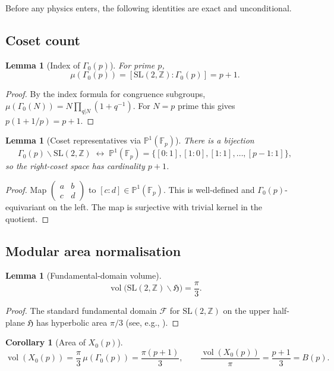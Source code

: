 \documentclass[12pt,a4paper]{article}
\newtheorem{lemma}[theorem]{Lemma}
\newtheorem{corollary}[theorem]{Corollary}
\theoremstyle{definition}
\theoremstyle{remark}
\newcommand{\SL}{\mathrm{SL}}
\newcommand{\vol}{\operatorname{vol}}
\newcommand{\bH}{\mathfrak{H}}     %
\newcommand{\ZZ}{\mathbb{Z}}
\newcommand{\FF}{\mathbb{F}}
\newcommand{\PP}{\mathbb{P}}
\newcommand{\Gam}{\Gamma}
\begin{document}
Before any physics enters, the following identities are exact and
unconditional.

\subsection{Coset count}

\begin{lemma}[Index of $\Gam_0(p)$]
\label{lem:index}
For prime $p$,
\[
  \mu(\Gam_0(p)) = [\SL(2,\ZZ):\Gam_0(p)] = p+1.
\]
\end{lemma}

\begin{proof}
By the index formula for congruence subgroups,
$\mu(\Gam_0(N))=N\prod_{q|N}(1+q^{-1})$.  For $N=p$ prime this gives
$p(1+1/p)=p+1$.
\end{proof}

\begin{lemma}[Coset representatives via $\PP^1(\FF_p)$]
\label{lem:cosets}
There is a bijection
\[
  \Gam_0(p)\backslash\SL(2,\ZZ)
  \;\longleftrightarrow\;
  \PP^1(\FF_p) = \{[0:1],[1:0],[1:1],\ldots,[p-1:1]\},
\]
so the right-coset space has cardinality $p+1$.
\end{lemma}

\begin{proof}
Map $\left(\begin{smallmatrix}a&b\\c&d\end{smallmatrix}\right)$ to
$[c:d]\in\PP^1(\FF_p)$.  This is well-defined and $\Gam_0(p)$-equivariant
on the left.  The map is surjective with trivial kernel in the quotient.
\end{proof}

\subsection{Modular area normalisation}

\begin{lemma}[Fundamental-domain volume]
\label{lem:fundvol}
\[
  \vol\!\bigl(\SL(2,\ZZ)\backslash\bH\bigr) = \frac{\pi}{3}.
\]
\end{lemma}

\begin{proof}
The standard fundamental domain $\mathcal{F}$ for $\SL(2,\ZZ)$ on the
upper half-plane $\bH$ has hyperbolic area $\pi/3$ (see, e.g.,
\cite{Serre:1973}).
\end{proof}

\begin{corollary}[Area of $X_0(p)$]
\label{cor:area}
\[
  \vol(X_0(p)) = \frac{\pi}{3}\,\mu(\Gam_0(p)) = \frac{\pi(p+1)}{3},
  \qquad
  \frac{\vol(X_0(p))}{\pi} = \frac{p+1}{3} = B(p).
\]
\end{corollary}
\end{document}
